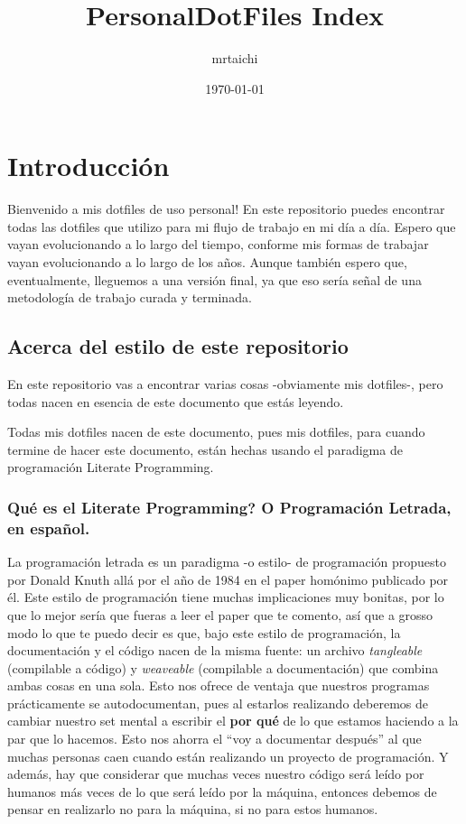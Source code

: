 \documentclass[11pt]{article}
\author{mrtaichi}
\date{\today}
\title{PersonalDotFiles Index}
\begin{document}
\maketitle
\tableofcontents

\section{Introducción}
\label{sec:orgbfc7052}
Bienvenido a mis dotfiles de uso personal! En este repositorio puedes encontrar todas las dotfiles que utilizo para mi flujo de trabajo en mi día a día. Espero que vayan evolucionando a lo largo del tiempo, conforme mis formas de trabajar vayan evolucionando a lo largo de los años. Aunque también espero que, eventualmente, lleguemos a una versión final, ya que eso sería señal de una metodología de trabajo curada y terminada.
\subsection{Acerca del estilo de este repositorio}
\label{sec:orgc8c2256}
En este repositorio vas a encontrar varias cosas -obviamente mis dotfiles-, pero todas nacen en esencia de este documento que estás leyendo.

Todas mis dotfiles nacen de este documento, pues mis dotfiles, para cuando termine de hacer este documento, están hechas usando el paradigma de programación Literate Programming.
\subsubsection{Qué es el Literate Programming? O Programación Letrada, en español.}
\label{sec:orgd031785}
La programación letrada es un paradigma -o estilo- de programación propuesto por Donald Knuth allá por el año de 1984 en el paper homónimo publicado por él. Este estilo de programación tiene muchas implicaciones muy bonitas, por lo que lo mejor sería que fueras a leer el paper que te comento, así que a grosso modo lo que te puedo decir es que, bajo este estilo de programación, la documentación y el código nacen de la misma fuente: un archivo \emph{tangleable} (compilable a código) y \emph{weaveable} (compilable a documentación) que combina ambas cosas en una sola.
Esto nos ofrece de ventaja que nuestros programas prácticamente se autodocumentan, pues al estarlos realizando deberemos de cambiar nuestro set mental a escribir el \textbf{por qué} de lo que estamos haciendo a la par que lo hacemos. Esto nos ahorra el ``voy a documentar después'' al que muchas personas caen cuando están realizando un proyecto de programación. Y además, hay que considerar que muchas veces nuestro código será leído por humanos más veces de lo que será leído por la máquina, entonces debemos de pensar en realizarlo no para la máquina, si no para estos humanos.
\end{document}
